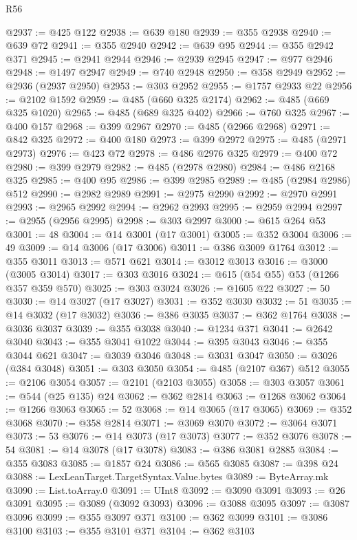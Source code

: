 \begin{lexlean}{R56}
\begin{coremodule}
@2937 := @425 @122
@2938 := @639 @180
@2939 := @355 @2938
@2940 := @639 @72
@2941 := @355 @2940
@2942 := @639 @95
@2944 := @355 @2942 @371
@2945 := @2941 @2944
@2946 := @2939 @2945
@2947 := @977 @2946
@2948 := @1497 @2947
@2949 := @740 @2948
@2950 := @358 @2949
@2952 := @2936 (@2937 @2950)
@2953 := @303 @2952
@2955 := @1757 @2933 @22
@2956 := @2102 @1592
@2959 := @485 (@660 @325 @2174)
@2962 := @485 (@669 @325 @1020)
@2965 := @485 (@689 @325 @402)
@2966 := @760 @325
@2967 := @400 @157
@2968 := @399 @2967
@2970 := @485 (@2966 @2968)
@2971 := @842 @325
@2972 := @400 @180
@2973 := @399 @2972
@2975 := @485 (@2971 @2973)
@2976 := @423 @72
@2978 := @486 @2976 @325
@2979 := @400 @72
@2980 := @399 @2979
@2982 := @485 (@2978 @2980)
@2984 := @486 @2168 @325
@2985 := @400 @95
@2986 := @399 @2985
@2989 := @485 (@2984 @2986) @512
@2990 := @2982 @2989
@2991 := @2975 @2990
@2992 := @2970 @2991
@2993 := @2965 @2992
@2994 := @2962 @2993
@2995 := @2959 @2994
@2997 := @2955 (@2956 @2995)
@2998 := @303 @2997
@3000 := @615 @264 @53
@3001 := 48
@3004 := @14 @3001 (@17 @3001)
@3005 := @352 @3004
@3006 := 49
@3009 := @14 @3006 (@17 @3006)
@3011 := @386 @3009 @1764
@3012 := @355 @3011
@3013 := @571 @621
@3014 := @3012 @3013
@3016 := @3000 (@3005 @3014)
@3017 := @303 @3016
@3024 := @615 (@54 @55) @53 (@1266 @357 @359 @570)
@3025 := @303 @3024
@3026 := @1605 @22
@3027 := 50
@3030 := @14 @3027 (@17 @3027)
@3031 := @352 @3030
@3032 := 51
@3035 := @14 @3032 (@17 @3032)
@3036 := @386 @3035
@3037 := @362 @1764
@3038 := @3036 @3037
@3039 := @355 @3038
@3040 := @1234 @371
@3041 := @2642 @3040
@3043 := @355 @3041 @1022
@3044 := @395 @3043
@3046 := @355 @3044 @621
@3047 := @3039 @3046
@3048 := @3031 @3047
@3050 := @3026 (@384 @3048)
@3051 := @303 @3050
@3054 := @485 (@2107 @367) @512
@3055 := @2106 @3054
@3057 := @2101 (@2103 @3055)
@3058 := @303 @3057
@3061 := @544 (@25 @135) @24
@3062 := @362 @2814
@3063 := @1268 @3062
@3064 := @1266 @3063
@3065 := 52
@3068 := @14 @3065 (@17 @3065)
@3069 := @352 @3068
@3070 := @358 @2814
@3071 := @3069 @3070
@3072 := @3064 @3071
@3073 := 53
@3076 := @14 @3073 (@17 @3073)
@3077 := @352 @3076
@3078 := 54
@3081 := @14 @3078 (@17 @3078)
@3083 := @386 @3081 @2885
@3084 := @355 @3083
@3085 := @1857 @24
@3086 := @565 @3085
@3087 := @398 @24
@3088 := LexLeanTarget.TargetSyntax.Value.bytes
@3089 := ByteArray.mk
@3090 := List.toArray.{0}
@3091 := UInt8
@3092 := @3090 @3091
@3093 := @26 @3091
@3095 := @3089 (@3092 @3093)
@3096 := @3088 @3095
@3097 := @3087 @3096
@3099 := @355 @3097 @371
@3100 := @362 @3099
@3101 := @3086 @3100
@3103 := @355 @3101 @371
@3104 := @362 @3103

\end{coremodule}
\end{lexlean}
